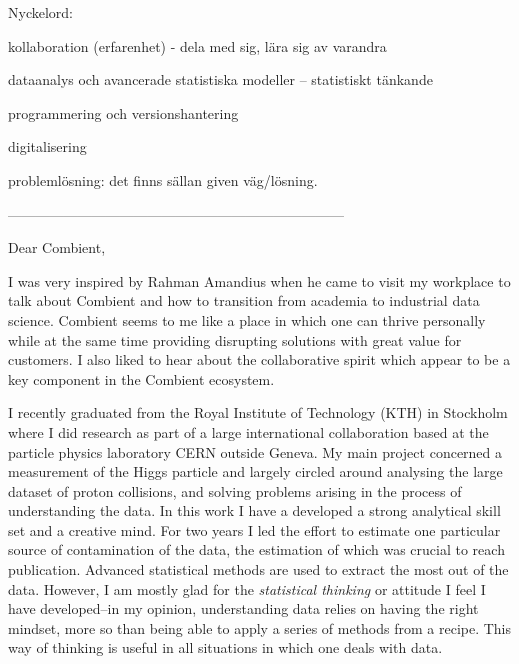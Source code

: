 \documentclass[11pt, a4paper]{../awesome-cv} %
\begin{document}
\sloppy %

\makecvheader %

\makelettertitle %


\begin{cvletter}
\vspace{.2cm}

Nyckelord: 

kollaboration (erfarenhet) - dela med sig, lära sig av varandra

dataanalys och avancerade statistiska modeller -- statistiskt tänkande

programmering och versionshantering

digitalisering 

problemlösning: det finns sällan given väg/lösning. 

------------------------------------------------------------------------

Dear Combient,

I was very inspired by Rahman Amandius when he came to visit my workplace to talk about Combient and how to transition from academia to industrial data science.
Combient seems to me like a place in which one can thrive personally while at the same time providing disrupting solutions with great value for customers.
I also liked to hear about the collaborative spirit which appear to be a key component in the Combient ecosystem.

I recently graduated from the Royal Institute of Technology (KTH) in Stockholm where I did research as part of a large international collaboration based at the particle physics laboratory CERN outside Geneva.
My main project concerned a measurement of the Higgs particle and largely circled around analysing the large dataset of proton collisions, and solving problems arising in the process of understanding the data.
In this work I have a developed a strong analytical skill set and a creative mind. 
For two years I led the effort to estimate one particular source of contamination of the data, the estimation of which was crucial to reach publication. 
Advanced statistical methods are used to extract the most out of the data.
However, I am mostly glad for the {\it statistical thinking} or attitude I feel I have developed--in my opinion, understanding data relies on having the right mindset, more so than being able to apply a series of methods from a recipe.
This way of thinking is useful in all situations in which one deals with data.


\end{cvletter}
\end{document}
